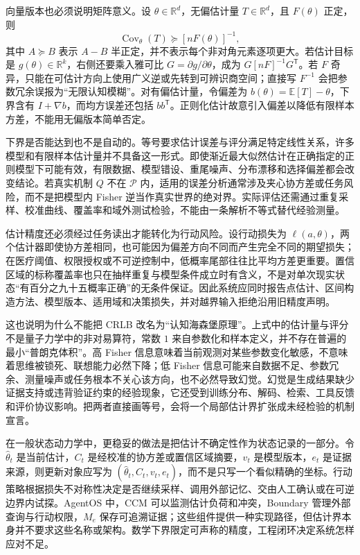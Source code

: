 向量版本也必须说明矩阵意义。设 $\theta\in\mathbb R^d$，无偏估计量 $T\in\mathbb R^d$，且 $F(\theta)$ 正定，则
\begin{equation}
    \operatorname{Cov}_\theta(T)\succeq [nF(\theta)]^{-1},
\end{equation}
其中 $A\succeq B$ 表示 $A-B$ 半正定，并不表示每个非对角元素逐项更大。若估计目标是 $g(\theta)\in\mathbb R^k$，右侧还要乘入雅可比 $G=\partial g/\partial\theta$，成为 $G[nF]^{-1}G^{\mathsf T}$。若 $F$ 奇异，只能在可估计方向上使用广义逆或先转到可辨识商空间；直接写 $F^{-1}$ 会把参数冗余误报为“无限认知模糊”。对有偏估计量，令偏差为 $b(\theta)=\mathbb E[T]-\theta$，下界含有 $I+\nabla b$，而均方误差还包括 $bb^{\mathsf T}$。正则化估计故意引入偏差以降低有限样本方差，不能用无偏版本简单否定。

下界是否能达到也不是自动的。等号要求估计误差与评分满足特定线性关系，许多模型和有限样本估计量并不具备这一形式。即使渐近最大似然估计在正确指定的正则模型下可能有效，有限数据、模型错设、重尾噪声、分布漂移和选择偏差都会改变结论。若真实机制 $Q$ 不在 $\mathcal P$ 内，适用的误差分析通常涉及夹心协方差或任务风险，而不是把模型内 Fisher 逆当作真实世界的绝对界。实际评估还需通过重复采样、校准曲线、覆盖率和域外测试检验，不能由一条解析不等式替代经验测量。

估计精度还必须经过任务读出才能转化为行动风险。设行动损失为 $\ell(a,\theta)$，两个估计器即使协方差相同，也可能因为偏差方向不同而产生完全不同的期望损失；在医疗阈值、权限授权或不可逆控制中，低概率尾部往往比平均方差更重要。置信区域的标称覆盖率也只在抽样重复与模型条件成立时有含义，不是对单次现实状态“有百分之九十五概率正确”的无条件保证。因此系统应同时报告点估计、区间构造方法、模型版本、适用域和决策损失，并对越界输入拒绝沿用旧精度声明。

这也说明为什么不能把 CRLB 改名为“认知海森堡原理”。上式中的估计量与评分不是量子力学中的非对易算符，常数 $1$ 来自参数化和样本定义，并不存在普遍的最小“普朗克体积”。高 Fisher 信息意味着当前观测对某些参数变化敏感，不意味着思维被锁死、联想能力必然下降；低 Fisher 信息可能来自数据不足、参数冗余、测量噪声或任务根本不关心该方向，也不必然导致幻觉。幻觉是生成结果缺少证据支持或违背验证约束的经验现象，它还受到训练分布、解码、检索、工具反馈和评价协议影响。把两者直接画等号，会将一个局部估计界扩张成未经检验的机制宣言。

在一般状态动力学中，更稳妥的做法是把估计不确定性作为状态记录的一部分。令 $\hat\theta_t$ 是当前估计，$C_t$ 是经校准的协方差或置信区域摘要，$v_t$ 是模型版本，$e_t$ 是证据来源，则更新对象应写为 $(\hat\theta_t,C_t,v_t,e_t)$，而不是只写一个看似精确的坐标。行动策略根据损失不对称性决定是否继续采样、调用外部记忆、交由人工确认或在可逆边界内试探。AgentOS 中，CCM 可以监测估计负荷和冲突，Boundary 管理外部查询与行动权限，$M_e$ 保存可追溯证据；这些组件提供一种实现路径，但估计界本身并不要求这些名称或架构。数学下界限定可声称的精度，工程闭环决定系统怎样应对不足。

